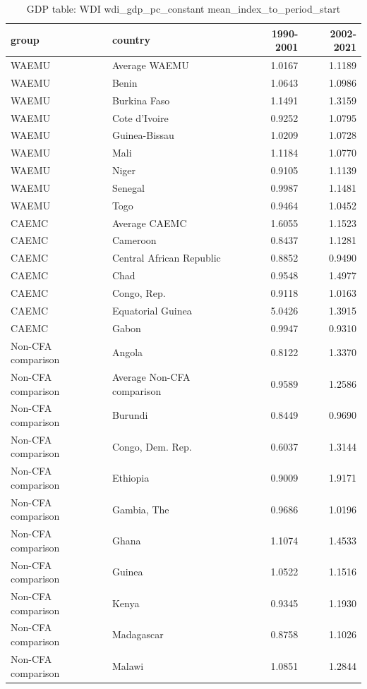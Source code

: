\begin{table}

\caption{GDP table: WDI wdi_gdp_pc_constant mean_index_to_period_start}
\centering
\begin{tabular}[t]{llrr}
\toprule
group & country & 1990-2001 & 2002-2021\\
\midrule
WAEMU & Average WAEMU & 1.0167 & 1.1189\\
WAEMU & Benin & 1.0643 & 1.0986\\
WAEMU & Burkina Faso & 1.1491 & 1.3159\\
WAEMU & Cote d'Ivoire & 0.9252 & 1.0795\\
WAEMU & Guinea-Bissau & 1.0209 & 1.0728\\
\addlinespace
WAEMU & Mali & 1.1184 & 1.0770\\
WAEMU & Niger & 0.9105 & 1.1139\\
WAEMU & Senegal & 0.9987 & 1.1481\\
WAEMU & Togo & 0.9464 & 1.0452\\
CAEMC & Average CAEMC & 1.6055 & 1.1523\\
\addlinespace
CAEMC & Cameroon & 0.8437 & 1.1281\\
CAEMC & Central African Republic & 0.8852 & 0.9490\\
CAEMC & Chad & 0.9548 & 1.4977\\
CAEMC & Congo, Rep. & 0.9118 & 1.0163\\
CAEMC & Equatorial Guinea & 5.0426 & 1.3915\\
\addlinespace
CAEMC & Gabon & 0.9947 & 0.9310\\
Non-CFA comparison & Angola & 0.8122 & 1.3370\\
Non-CFA comparison & Average Non-CFA comparison & 0.9589 & 1.2586\\
Non-CFA comparison & Burundi & 0.8449 & 0.9690\\
Non-CFA comparison & Congo, Dem. Rep. & 0.6037 & 1.3144\\
\addlinespace
Non-CFA comparison & Ethiopia & 0.9009 & 1.9171\\
Non-CFA comparison & Gambia, The & 0.9686 & 1.0196\\
Non-CFA comparison & Ghana & 1.1074 & 1.4533\\
Non-CFA comparison & Guinea & 1.0522 & 1.1516\\
Non-CFA comparison & Kenya & 0.9345 & 1.1930\\
\addlinespace
Non-CFA comparison & Madagascar & 0.8758 & 1.1026\\
Non-CFA comparison & Malawi & 1.0851 & 1.2844\\

\end{tabular}
\end{table}
